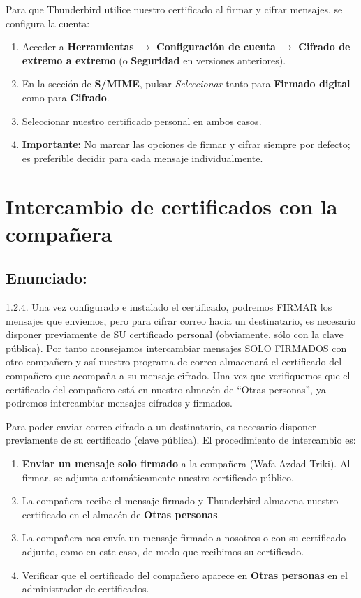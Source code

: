 Para que Thunderbird utilice nuestro certificado al firmar y cifrar mensajes, se configura la cuenta:

\begin{enumerate}
    \item Acceder a \textbf{Herramientas $\rightarrow$ Configuración de cuenta $\rightarrow$ Cifrado de extremo a extremo} (o \textbf{Seguridad} en versiones anteriores).
    \item En la sección de \textbf{S/MIME}, pulsar \textit{Seleccionar} tanto para \textbf{Firmado digital} como para \textbf{Cifrado}.
    \item Seleccionar nuestro certificado personal en ambos casos.
    \item \textbf{Importante:} No marcar las opciones de firmar y cifrar siempre por defecto; es preferible decidir para cada mensaje individualmente.
\end{enumerate}

\section{Intercambio de certificados con la compañera}
\subsection{Enunciado:}
1.2.4. Una vez configurado e instalado el certificado, podremos FIRMAR los mensajes que enviemos, pero
para cifrar correo hacia un destinatario, es necesario disponer previamente de SU certificado personal
(obviamente, sólo con la clave pública). Por tanto aconsejamos intercambiar mensajes SOLO FIRMADOS
con otro compañero y así nuestro programa de correo almacenará el certificado del compañero que acompaña
a su mensaje cifrado. Una vez que verifiquemos que el certificado del compañero está en nuestro almacén de
``Otras personas'', ya podremos intercambiar mensajes cifrados y firmados.

Para poder enviar correo cifrado a un destinatario, es necesario disponer previamente de su certificado (clave pública). El procedimiento de intercambio es:

\begin{enumerate}
    \item \textbf{Enviar un mensaje solo firmado} a la compañera (Wafa Azdad Triki). Al firmar, se adjunta automáticamente nuestro certificado público.
    \item La compañera recibe el mensaje firmado y Thunderbird almacena nuestro certificado en el almacén de \textbf{Otras personas}.
    \item La compañera nos envía un mensaje firmado a nosotros o con su certificado adjunto, como en este caso, de modo que recibimos su certificado.
    \item Verificar que el certificado del compañero aparece en \textbf{Otras personas} en el administrador de certificados.
\end{enumerate}

